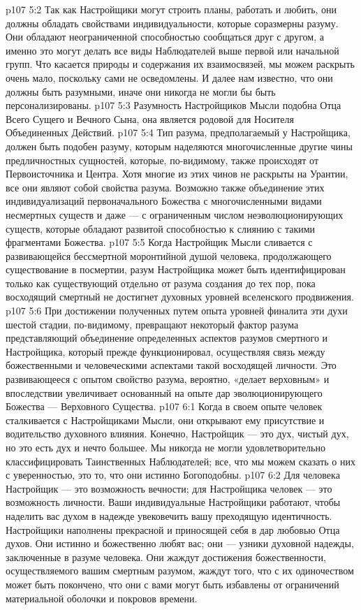 \vs p107 5:2 Так как Настройщики могут строить планы, работать и любить, они должны обладать свойствами индивидуальности, которые соразмерны разуму. Они обладают неограниченной способностью сообщаться друг с другом, а именно это могут делать все виды Наблюдателей выше первой или начальной групп. Что касается природы и содержания их взаимосвязей, мы можем раскрыть очень мало, поскольку сами не осведомлены. И далее нам известно, что они должны быть разумными, иначе они никогда не могли бы быть персонализированы.
\vs p107 5:3 Разумность Настройщиков Мысли подобна  Отца Всего Сущего и Вечного Сына, она является родовой для  Носителя Объединенных Действий.
\vs p107 5:4 Тип разума, предполагаемый у Настройщика, должен быть подобен разуму, которым наделяются многочисленные другие чины предличностных сущностей, которые, по\hyp{}видимому, также происходят от Первоисточника и Центра. Хотя многие из этих чинов не раскрыты на Урантии, все они являют собой свойства разума. Возможно также объединение этих индивидуализаций первоначального Божества с многочисленными видами несмертных существ и даже --- с ограниченным числом неэволюционирующих существ, которые обладают развитой способностью к слиянию с такими фрагментами Божества.
\vs p107 5:5 Когда Настройщик Мысли сливается с развивающейся бессмертной моронтийной душой человека, продолжающего существование в посмертии, разум Настройщика может быть идентифицирован только как существующий отдельно от разума создания до тех пор, пока восходящий смертный не достигнет духовных уровней вселенского продвижения.
\vs p107 5:6 При достижении полученных путем опыта уровней финалита эти духи шестой стадии, по\hyp{}видимому, превращают некоторый фактор разума представляющий объединение определенных аспектов разумов смертного и Настройщика, который прежде функционировал, осуществляя связь между божественными и человеческими аспектами такой восходящей личности. Это развивающееся с опытом свойство разума, вероятно, «делает верховным» и впоследствии увеличивает основанный на опыте дар эволюционирующего Божества --- Верховного Существа.
\vs p107 6:1 Когда в своем опыте человек сталкивается с Настройщиками Мысли, они открывают ему присутствие и водительство духовного влияния. Конечно, Настройщик --- это дух, чистый дух, но это есть дух и нечто большее. Мы никогда не могли удовлетворительно классифицировать Таинственных Наблюдателей; все, что мы можем сказать о них с уверенностью, это то, что они истинно Богоподобны.
\vs p107 6:2 Для человека Настройщик --- это возможность вечности; для Настройщика человек --- это возможность личности. Ваши индивидуальные Настройщики работают, чтобы наделить вас духом в надежде увековечить вашу преходящую идентичность. Настройщики наполнены прекрасной и приносящей себя в дар любовью Отца духов. Они истинно и божественно любят вас; они --- узники духовной надежды, заключенные в разуме человека. Они жаждут достижения божественности, осуществляемого вашим смертным разумом, жаждут того, что с их одиночеством может быть покончено, что они с вами могут быть избавлены от ограничений материальной оболочки и покровов времени.
